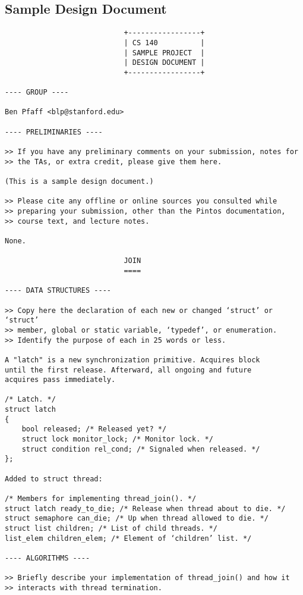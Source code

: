 \begin{appendices}
\section{Sample Design Document}

\begin{verbatim}
                            +-----------------+
                            | CS 140          |
                            | SAMPLE PROJECT  |
                            | DESIGN DOCUMENT |
                            +-----------------+
							
---- GROUP ----

Ben Pfaff <blp@stanford.edu>

---- PRELIMINARIES ----

>> If you have any preliminary comments on your submission, notes for
>> the TAs, or extra credit, please give them here.

(This is a sample design document.)

>> Please cite any offline or online sources you consulted while
>> preparing your submission, other than the Pintos documentation,
>> course text, and lecture notes.

None.

                            JOIN
                            ====
							
---- DATA STRUCTURES ----

>> Copy here the declaration of each new or changed ‘struct’ or ‘struct’
>> member, global or static variable, ‘typedef’, or enumeration.
>> Identify the purpose of each in 25 words or less.

A "latch" is a new synchronization primitive. Acquires block
until the first release. Afterward, all ongoing and future
acquires pass immediately.

/* Latch. */
struct latch
{
    bool released; /* Released yet? */
    struct lock monitor_lock; /* Monitor lock. */
    struct condition rel_cond; /* Signaled when released. */
};

Added to struct thread:

/* Members for implementing thread_join(). */
struct latch ready_to_die; /* Release when thread about to die. */
struct semaphore can_die; /* Up when thread allowed to die. */
struct list children; /* List of child threads. */
list_elem children_elem; /* Element of ‘children’ list. */

---- ALGORITHMS ----

>> Briefly describe your implementation of thread_join() and how it
>> interacts with thread termination.


\end{verbatim}
\end{appendices}
